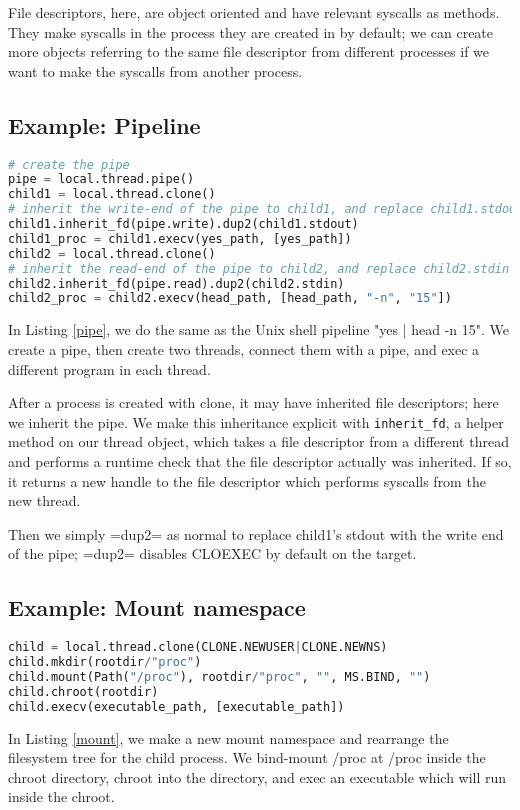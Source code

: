 \documentclass{acmart}
\begin{document}
File descriptors, here, are object oriented and have relevant syscalls as methods.
They make syscalls in the process they are created in by default;
we can create more objects referring to the same file descriptor from different processes
if we want to make the syscalls from another process.
\subsection{Example: Pipeline}
\begin{lstlisting}[float,language=Python,label={pipe},caption={Creating a pipeline}]
# create the pipe
pipe = local.thread.pipe()
child1 = local.thread.clone()
# inherit the write-end of the pipe to child1, and replace child1.stdout with it
child1.inherit_fd(pipe.write).dup2(child1.stdout)
child1_proc = child1.execv(yes_path, [yes_path])
child2 = local.thread.clone()
# inherit the read-end of the pipe to child2, and replace child2.stdin with it
child2.inherit_fd(pipe.read).dup2(child2.stdin)
child2_proc = child2.execv(head_path, [head_path, "-n", "15"])
\end{lstlisting}
In Listing \ref{pipe},
we do the same as the Unix shell pipeline "yes | head -n 15".
We create a pipe,
then create two threads,
connect them with a pipe,
and exec a different program in each thread.

After a process is created with clone,
it may have inherited file descriptors;
here we inherit the pipe.
We make this inheritance explicit with \texttt{inherit\_fd},
a helper method on our thread object,
which takes a file descriptor from a different thread
and performs a runtime check that the file descriptor actually was inherited.
If so, it returns a new handle to the file descriptor which performs syscalls from the new thread.

Then we simply =dup2= as normal to replace child1's stdout with the write end of the pipe;
=dup2= disables CLOEXEC by default on the target.
\subsection{Example: Mount namespace}
\begin{lstlisting}[float,language=Python,label={mount},caption={Mount namespace}]
child = local.thread.clone(CLONE.NEWUSER|CLONE.NEWNS)
child.mkdir(rootdir/"proc")
child.mount(Path("/proc"), rootdir/"proc", "", MS.BIND, "")
child.chroot(rootdir)
child.execv(executable_path, [executable_path])
\end{lstlisting}
In Listing \ref{mount},
we make a new mount namespace and rearrange the filesystem tree for the child process.
We bind-mount /proc at /proc inside the chroot directory,
chroot into the directory,
and exec an executable which will run inside the chroot.
\end{document}

